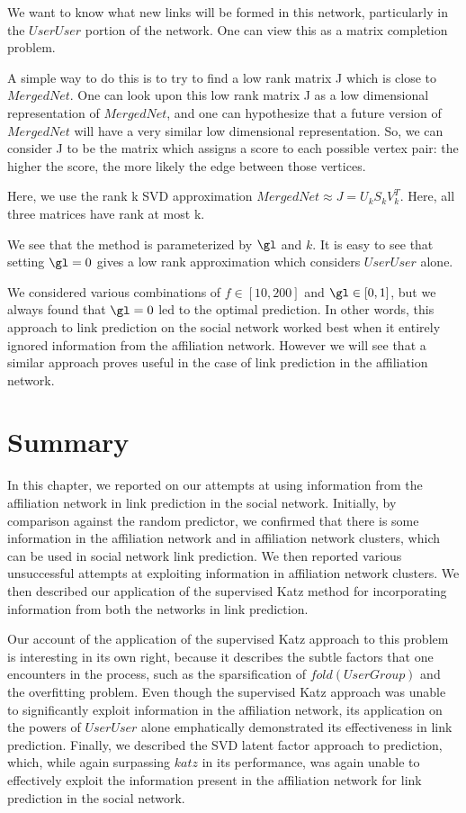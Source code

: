 \documentclass{report}
\begin{document}
We want to know what new links will be formed in this network, particularly in the $UserUser$ portion of the network. One can view this as a matrix completion problem.

A simple way to do this is to try to find a low rank matrix J which is close to $MergedNet$. One can look upon this low rank matrix J as a low dimensional representation of $MergedNet$, and one can hypothesize that a future version of $MergedNet$ will have a very similar low dimensional representation. So, we can consider J to be the matrix which assigns a score to each possible vertex pair: the higher the score, the more likely the edge between those vertices.

Here, we use the rank k SVD approximation $MergedNet \approx J = U_k S_k V_k^{T}$. Here, all three matrices have rank at most k.

We see that the method is parameterized by $\gl$ and $k$. It is easy to see that setting $\gl = 0$ gives a low rank approximation which considers $UserUser$ alone.

We considered various combinations of $f \in [10, 200]$ and $\gl \in [0,1]$, but we always found that $\gl = 0$ led to the optimal prediction. In other words, this approach to link prediction on the social network worked best when it entirely ignored information from the affiliation network. However we will see that a similar approach proves useful in the case of link prediction in the affiliation network.

\section{Summary}
In this chapter, we reported on our attempts at using information from the affiliation network in link prediction in the social network. Initially, by comparison against the random predictor, we confirmed that there is some information in the affiliation network and in affiliation network clusters, which can be used in social network link prediction. We then reported various unsuccessful attempts at exploiting information in affiliation network clusters. We then described our application of the supervised Katz method for incorporating information from both the networks in link prediction.

Our account of the application of the supervised Katz approach to this problem is interesting in its own right, because it describes the subtle factors that one encounters in the process, such as the sparsification of $fold(UserGroup)$ and the overfitting problem. Even though the supervised Katz approach was unable to significantly exploit information in the affiliation network, its application on the powers of $UserUser$ alone emphatically demonstrated its effectiveness in link prediction. Finally, we described the SVD latent factor approach to prediction, which, while again surpassing $katz$ in its performance, was again unable to effectively exploit the information present in the affiliation network for link prediction in the social network.
\end{document}
